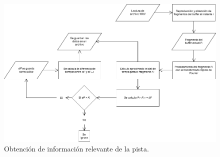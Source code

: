 \begin{landscape}
\begin{figure}
\centering
\includegraphics[width=22cm]{./Figuras/diagram2}
\caption[Obtenci\'on de informaci\'on]{Obtenci\'on de informaci\'on relevante de la pista.}
\label{fig:diaginfo}
\end{figure}
\end{landscape}